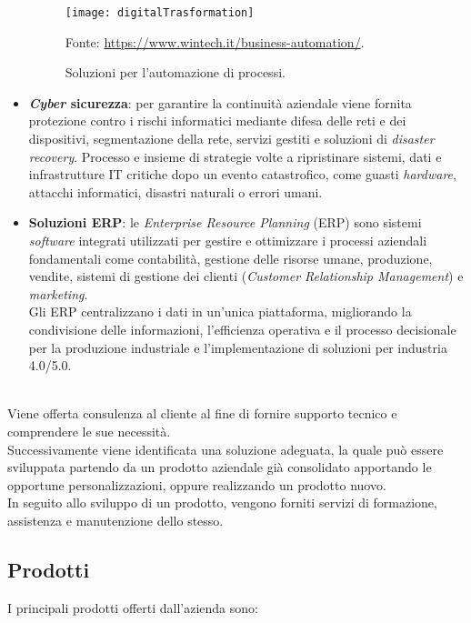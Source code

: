 \begin{itemize}
	\begin{figure}[htbp] 
        \centering 
        \texttt{[image: digitalTrasformation]}
        \caption{Soluzioni per l'automazione di processi.} 
        \label{fig:digitalTransformation}
        Fonte: \url{https://www.wintech.it/business-automation/}.
    \end{figure}
    \item \textbf{\emph{Cyber} sicurezza}: per garantire la continuità aziendale viene fornita protezione contro i rischi informatici mediante difesa delle reti e dei dispositivi, segmentazione della rete, servizi gestiti e soluzioni di \emph{disaster recovery}. Processo e insieme di strategie volte a ripristinare sistemi, dati e infrastrutture \gls{IT} critiche dopo un evento catastrofico, come guasti \emph{hardware}, attacchi informatici, disastri naturali o errori umani.\\
	\item \textbf{Soluzioni ERP}: le \emph{Enterprise Resource Planning} (ERP) sono sistemi \emph{software} integrati utilizzati per gestire e ottimizzare i processi aziendali fondamentali come contabilità, gestione delle risorse umane, produzione, vendite, sistemi di gestione dei clienti (\emph{Customer Relationship Management}) e \emph{marketing}.\\
    Gli ERP centralizzano i dati in un'unica piattaforma, migliorando la condivisione delle informazioni, l'efficienza operativa e il processo decisionale per la produzione industriale e l'implementazione di soluzioni per industria 4.0/5.0.\\\\
\end{itemize}
Viene offerta consulenza al cliente al fine di fornire supporto tecnico e comprendere le sue necessità.\\
Successivamente viene identificata una soluzione adeguata, la quale può essere sviluppata partendo da un prodotto aziendale già consolidato apportando le opportune personalizzazioni, oppure realizzando un prodotto nuovo.\\
In seguito allo sviluppo di un prodotto, vengono forniti servizi di formazione, assistenza e manutenzione dello stesso.\\

\subsection{Prodotti}
I principali prodotti offerti dall'azienda sono: 

